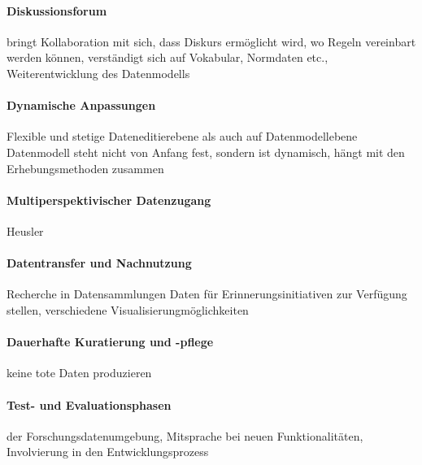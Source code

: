 \paragraph{Diskussionsforum}
bringt Kollaboration mit sich, dass Diskurs ermöglicht wird, wo Regeln vereinbart werden können, verständigt sich auf Vokabular, Normdaten etc., Weiterentwicklung des Datenmodells
\paragraph{Dynamische Anpassungen}
Flexible und stetige 
Dateneditierebene als auch auf Datenmodellebene
Datenmodell steht nicht von Anfang fest, sondern ist dynamisch, hängt mit den Erhebungsmethoden zusammen
\paragraph{Multiperspektivischer Datenzugang}
Heusler

\paragraph{Datentransfer und Nachnutzung}
Recherche in Datensammlungen
Daten für Erinnerungsinitiativen zur Verfügung stellen, verschiedene Visualisierungmöglichkeiten

\paragraph{Dauerhafte Kuratierung und -pflege}
keine tote Daten produzieren

\paragraph{Test- und Evaluationsphasen}
der Forschungsdatenumgebung, Mitsprache bei neuen Funktionalitäten, Involvierung in den Entwicklungsprozess